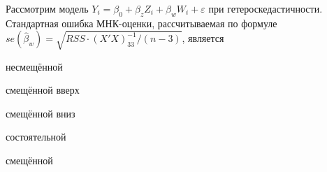 
\begin{question}
Рассмотрим модель
\(Y_i= \beta_0 + \beta_z Z_{i} + \beta_w W_{i} + \varepsilon\) при
гетероскедастичности. Стандартная ошибка МНК-оценки, рассчитываемая по
формуле \(se(\hat\beta_w)=\sqrt{RSS \cdot (X'X)^{-1}_{33}/(n-3)}\),
является
\begin{answerlist}
  \item несмещённой
  \item смещённой вверх
  \item смещённой вниз
  \item состоятельной
  \item смещённой
\end{answerlist}
\end{question}


